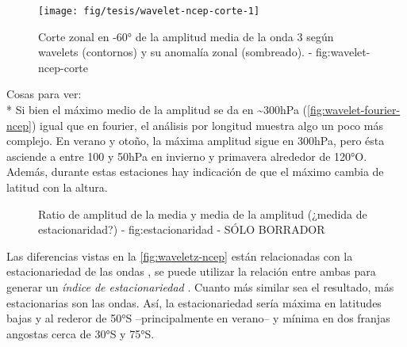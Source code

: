 \documentclass[spanish,a4paper]{book}
\begin{document}

\begin{figure}

{\centering \texttt{[image: fig/tesis/wavelet-ncep-corte-1]} 

}

\caption{Corte zonal en -60° de la amplitud media de la onda 3 según wavelets (contornos) y su anomalía zonal (sombreado). - fig:wavelet-ncep-corte}\label{fig:wavelet-ncep-corte}
\end{figure}

Cosas para ver:\\
* Si bien el máximo medio de la amplitud se da en
\textasciitilde{}300hPa (\autoref{fig:wavelet-fourier-ncep}) igual que
en fourier, el análisis por longitud muestra algo un poco más complejo.
En verano y otoño, la máxima amplitud sigue en 300hPa, pero ésta
asciende a entre 100 y 50hPa en invierno y primavera alrededor de 120°O.
Además, durante estas estaciones hay indicación de que el máximo cambia
de latitud con la altura.

\begin{figure}
\newline{}\caption{Ratio de amplitud de la media y media de la amplitud (¿medida de estacionaridad?) - fig:estacionaridad - SÓLO BORRADOR}\label{fig:estacionaridad}
\end{figure}

Las diferencias vistas en la \autoref{fig:waveletz-ncep} están
relacionadas con la estacionariedad de las ondas
,
se puede utilizar la relación entre ambas para generar un \emph{índice
de estacionariedad} . Cuanto más
similar sea el resultado, más estacionarias son las ondas. Así, la
estacionariedad sería máxima en latitudes bajas y al rederor de 50°S
--principalmente en verano-- y mínima en dos franjas angostas cerca de
30°S y 75°S. 
\end{document}
